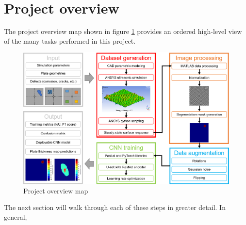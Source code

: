 \documentclass[11pt,letterpaper]{article}
\begin{document}
	\section{Project overview}
	The project overview map shown in figure \ref{fig:overview} provides an ordered high-level view of the many tasks performed in this project.
	\begin{figure}[H]
		\centering
		\includegraphics[width=\textwidth]{project_overview.png}
		\caption{Project overview map}
		\label{fig:overview}
	\end{figure}
	The next section will walk through each of these steps in greater detail. In general,
\end{document}
